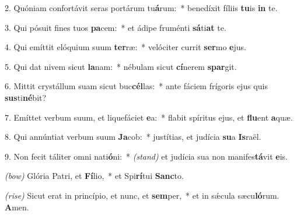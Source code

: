 2. Quóniam confortávit seras portárum tu\textbf{á}rum:~* benedíxit fíliis \textbf{tu}is \textbf{in} te.

3. Qui pósuit fines tuos \textbf{pa}cem:~* et ádipe fruménti \textbf{sá}ti\textbf{at} te.

4. Qui emíttit elóquium suum \textbf{ter}ræ:~* velóciter currit \textbf{ser}mo \textbf{e}jus.

5. Qui dat nivem sicut \textbf{la}nam:~* nébulam sicut \textbf{cí}nerem \textbf{spar}git.

6. Mittit crystállum suam sicut buc\textbf{cél}las:~* ante fáciem frígoris ejus quis \textbf{sus}ti\textbf{né}bit?

7. Emíttet verbum suum, et liquefáciet \textbf{e}a:~* flabit spíritus ejus, et \textbf{flu}ent \textbf{a}quæ.

8. Qui annúntiat verbum suum \textbf{Ja}cob:~* justítias, et judícia \textbf{su}a \textbf{Is}raël.

9. Non fecit táliter omni nati\textbf{ó}ni:~* {\color{red}\textit{(stand)}} et judícia sua non manifes\textbf{tá}vit \textbf{e}is.

{\color{red}\textit{(bow)}} Glória Patri, et \textbf{Fí}lio,~* et Spi\textbf{rí}tui \textbf{Sanc}to.

{\color{red}\textit{(rise)}} Sicut erat in princípio, et nunc, et \textbf{sem}per,~* et in s\'{\ae}cula sæcu\textbf{ló}rum. \textbf{A}men.
